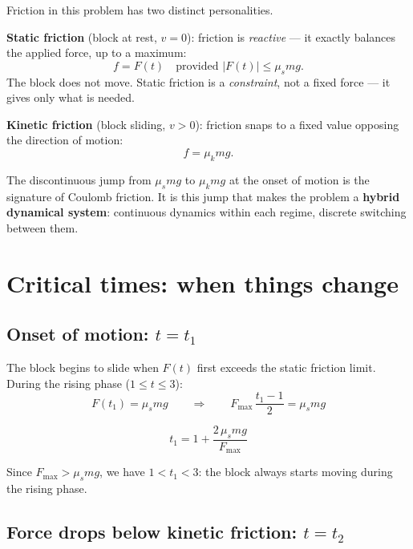 \documentclass[11pt, a4paper]{article}
\begin{document}
Friction in this problem has two distinct personalities.

\medskip
\noindent
\textbf{Static friction} (block at rest, $v = 0$): friction is \emph{reactive} ---
it exactly balances the applied force, up to a maximum:
\begin{equation}
f = F(t) \quad \text{provided } |F(t)| \le \mu_s m g.
\label{eq:static}
\end{equation}
The block does not move.  Static friction is a \emph{constraint}, not a
fixed force --- it gives only what is needed.

\medskip
\noindent
\textbf{Kinetic friction} (block sliding, $v > 0$): friction snaps to a fixed
value opposing the direction of motion:
\begin{equation}
f = \mu_k m g.
\label{eq:kinetic}
\end{equation}

\noindent
The discontinuous jump from $\mu_s mg$ to $\mu_k mg$ at the onset of motion
is the signature of Coulomb friction.  It is this jump that makes the problem
a \textbf{hybrid dynamical system}: continuous dynamics within each regime,
discrete switching between them.

\section{Critical times: when things change}
\label{sec:critical}

\subsection{Onset of motion: $t = t_1$}

The block begins to slide when $F(t)$ first exceeds the static friction limit.
During the rising phase ($1 \le t \le 3$):
\begin{equation}
F(t_1) = \mu_s m g
\qquad\Longrightarrow\qquad
F_{\max}\,\frac{t_1 - 1}{2} = \mu_s m g
\end{equation}

\begin{equation}
\boxed{t_1 = 1 + \frac{2\,\mu_s m g}{F_{\max}}}
\label{eq:t1}
\end{equation}

\noindent
Since $F_{\max} > \mu_s m g$, we have $1 < t_1 < 3$: the block always
starts moving during the rising phase.

\subsection{Force drops below kinetic friction: $t = t_2$}
\end{document}
